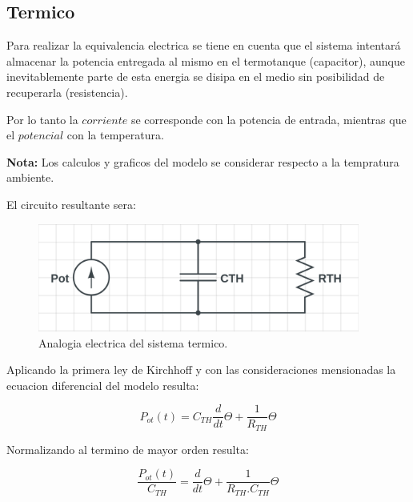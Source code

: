 \documentclass[a4paper,12pt]{article}
\begin{document}
\newpage

\subsection{Termico}
Para realizar la equivalencia electrica se tiene en cuenta que el sistema intentará almacenar la potencia entregada al mismo en el termotanque (capacitor), aunque inevitablemente parte de esta energia se disipa en el medio sin posibilidad de recuperarla (resistencia).\par
Por lo tanto la $corriente$ se corresponde con la potencia de entrada, mientras que el $potencial$ con la temperatura.\par

\vspace*{0.2in}

\textbf{Nota:} Los calculos y graficos del modelo se considerar respecto a la tempratura ambiente.\par

\vspace*{0.3in}
El circuito resultante sera:\par

\begin{figure}[H]
\begin{center}
\includegraphics[width = 300pt]{imagenes/RC_termico.png}
\caption{\small Analogia electrica del sistema termico. }
\end{center}
\end{figure}

Aplicando la primera ley de Kirchhoff y con las consideraciones mensionadas la ecuacion diferencial del modelo resulta:\par

\begin{equation}
P_{ot}(t)= C_{TH}\frac{d}{dt}\Theta+\frac{1}{R_{TH}}\Theta
\end{equation}\par

Normalizando al termino de mayor orden resulta:\par

\begin{equation}
\frac{P_{ot}(t)}{C_{TH}}=\frac{d}{dt}
\Theta+\frac{1}{R_{TH}.C_{TH}}\Theta
\end{equation}
\end{document}

